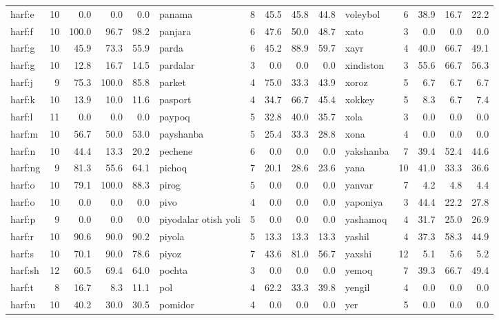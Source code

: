\documentclass[a4paper,10pt]{article}
\begin{document}
\begin{longtable}{lrrrr|lrrrr|lrrrr}
harf:e & 10 & 0.0 & 0.0 & 0.0 & panama & 8 & 45.5 & 45.8 & 44.8 & voleybol & 6 & 38.9 & 16.7 & 22.2 \\
harf:f & 10 & 100.0 & 96.7 & 98.2 & panjara & 6 & 47.6 & 50.0 & 48.7 & xato & 3 & 0.0 & 0.0 & 0.0 \\
harf:g & 10 & 45.9 & 73.3 & 55.9 & parda & 6 & 45.2 & 88.9 & 59.7 & xayr & 4 & 40.0 & 66.7 & 49.1 \\
harf:g\textquotesingle{} & 10 & 12.8 & 16.7 & 14.5 & pardalar & 3 & 0.0 & 0.0 & 0.0 & xindiston & 3 & 55.6 & 66.7 & 56.3 \\
harf:j & 9 & 75.3 & 100.0 & 85.8 & parket & 4 & 75.0 & 33.3 & 43.9 & xo\textquotesingle{}roz & 5 & 6.7 & 6.7 & 6.7 \\
harf:k & 10 & 13.9 & 10.0 & 11.6 & pasport & 4 & 34.7 & 66.7 & 45.4 & xokkey & 5 & 8.3 & 6.7 & 7.4 \\
harf:l & 11 & 0.0 & 0.0 & 0.0 & paypoq & 5 & 32.8 & 40.0 & 35.7 & xola & 3 & 0.0 & 0.0 & 0.0 \\
harf:m & 10 & 56.7 & 50.0 & 53.0 & payshanba & 5 & 25.4 & 33.3 & 28.8 & xona & 4 & 0.0 & 0.0 & 0.0 \\
harf:n & 10 & 44.4 & 13.3 & 20.2 & pechene & 6 & 0.0 & 0.0 & 0.0 & yakshanba & 7 & 39.4 & 52.4 & 44.6 \\
harf:ng & 9 & 81.3 & 55.6 & 64.1 & pichoq & 7 & 20.1 & 28.6 & 23.6 & yana & 10 & 41.0 & 33.3 & 36.6 \\
harf:o & 10 & 79.1 & 100.0 & 88.3 & pirog & 5 & 0.0 & 0.0 & 0.0 & yanvar & 7 & 4.2 & 4.8 & 4.4 \\
harf:o\textquotesingle{} & 10 & 0.0 & 0.0 & 0.0 & pivo & 4 & 0.0 & 0.0 & 0.0 & yaponiya & 3 & 44.4 & 22.2 & 27.8 \\
harf:p & 9 & 0.0 & 0.0 & 0.0 & piyodalar o\textquotesingle{}tish yo\textquotesingle{}li & 5 & 0.0 & 0.0 & 0.0 & yashamoq & 4 & 31.7 & 25.0 & 26.9 \\
harf:r & 10 & 90.6 & 90.0 & 90.2 & piyola & 5 & 13.3 & 13.3 & 13.3 & yashil & 4 & 37.3 & 58.3 & 44.9 \\
harf:s & 10 & 70.1 & 90.0 & 78.6 & piyoz & 7 & 43.6 & 81.0 & 56.7 & yaxshi & 12 & 5.1 & 5.6 & 5.2 \\
harf:sh & 12 & 60.5 & 69.4 & 64.0 & pochta & 3 & 0.0 & 0.0 & 0.0 & yemoq & 7 & 39.3 & 66.7 & 49.4 \\
harf:t & 8 & 16.7 & 8.3 & 11.1 & pol & 4 & 62.2 & 33.3 & 39.8 & yengil & 4 & 0.0 & 0.0 & 0.0 \\
harf:u & 10 & 40.2 & 30.0 & 30.5 & pomidor & 4 & 0.0 & 0.0 & 0.0 & yer & 5 & 0.0 & 0.0 & 0.0 \\

\end{longtable}
\end{document}
